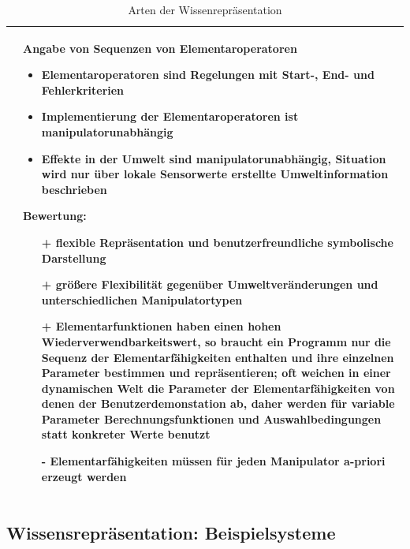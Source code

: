 \begin{table}[hbt]
\begin{tabular}{|p{8cm}|p{8cm}|}
\begin{itemize}
\end{itemize}
 &
 Angabe von Sequenzen von Elementaroperatoren
 \vspace{-4mm}
\begin{itemize}
\setlength\itemsep{0em}
\item Elementaroperatoren sind Regelungen mit Start-, End- und Fehlerkriterien
\item Implementierung der Elementaroperatoren ist manipulatorunabhängig
\item Effekte in der Umwelt sind manipulatorunabhängig, Situation wird nur über lokale Sensorwerte erstellte Umweltinformation beschrieben
\end{itemize}
Bewertung:
\begin{itemize}
\setlength\itemsep{0em}
\item[+] flexible Repräsentation und benutzerfreundliche symbolische Darstellung
\item[+] größere Flexibilität gegenüber Umweltveränderungen und unterschiedlichen Manipulatortypen
\item[+] Elementarfunktionen haben einen hohen Wiederverwendbarkeitswert, so braucht ein Programm nur die Sequenz der Elementarfähigkeiten
enthalten und ihre einzelnen Parameter bestimmen und repräsentieren;  oft weichen in einer
dynamischen Welt die Parameter der Elementarfähigkeiten von denen der Benutzerdemonstation ab, daher werden für variable Parameter Berechnungsfunktionen und
Auswahlbedingungen statt konkreter Werte benutzt
\item[-] Elementarfähigkeiten müssen für jeden Manipulator a-priori erzeugt werden 
\end{itemize}\\
\hline
\end{tabular}
\caption{Arten der Wissenrepräsentation}
\label{tab:Wissrep}
\end{table}

\subsection{Wissensrepräsentation: Beispielsysteme}
